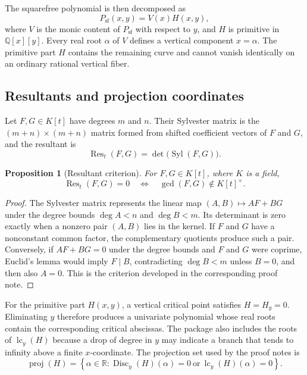 \documentclass[11pt,a4paper]{article}
\newtheorem{proposition}[definition]{Proposition}
\newcommand{\QQ}{\mathbb{Q}}
\newcommand{\RR}{\mathbb{R}}
\newcommand{\Res}{\operatorname{Res}}
\newcommand{\Disc}{\operatorname{Disc}}
\newcommand{\lc}{\operatorname{lc}}
\begin{document}
The squarefree polynomial is then decomposed as
\begin{equation}
  P_{\mathrm{sf}}(x,y)=V(x)H(x,y),
  \label{eq:vertical-decomposition}
\end{equation}
where $V$ is the monic content of $P_{\mathrm{sf}}$ with respect to $y$, and
$H$ is primitive in $\QQ[x][y]$. Every real root $\alpha$ of $V$ defines a
vertical component $x=\alpha$. The primitive part $H$ contains the remaining
curve and cannot vanish identically on an ordinary rational vertical fiber.

\subsection{Resultants and projection coordinates}

Let $F,G\in K[t]$ have degrees $m$ and $n$. Their Sylvester matrix is the
$(m+n)\times(m+n)$ matrix formed from shifted coefficient vectors of $F$ and
$G$, and the resultant is
\[
  \Res_t(F,G)=\det\bigl(\operatorname{Syl}(F,G)\bigr).
\]

\begin{proposition}[Resultant criterion]
For $F,G\in K[t]$, where $K$ is a field,
\[
  \Res_t(F,G)=0
  \quad\Longleftrightarrow\quad
  \gcd(F,G)\notin K[t]^{\times}.
\]
\end{proposition}

\begin{proof}
The Sylvester matrix represents the linear map
$(A,B)\mapsto AF+BG$ under the degree bounds
$\deg A<n$ and $\deg B<m$. Its determinant is zero exactly when a nonzero
pair $(A,B)$ lies in the kernel. If $F$ and $G$ have a nonconstant common
factor, the complementary quotients produce such a pair. Conversely, if
$AF+BG=0$ under the degree bounds and $F$ and $G$ were coprime, Euclid's lemma
would imply $F\mid B$, contradicting $\deg B<m$ unless $B=0$, and then also
$A=0$. This is the criterion developed in the corresponding proof note.
\end{proof}

For the primitive part $H(x,y)$, a vertical critical point satisfies
$H=H_y=0$. Eliminating $y$ therefore produces a univariate polynomial whose
real roots contain the corresponding critical abscissas. The package also
includes the roots of $\lc_y(H)$ because a drop of degree in $y$ may indicate
a branch that tends to infinity above a finite $x$-coordinate. The projection
set used by the proof notes is
\[
  \operatorname{proj}(H)=
  \left\{\alpha\in\RR:
    \Disc_y(H)(\alpha)=0
    \ \text{or}\ 
    \lc_y(H)(\alpha)=0
  \right\}.
\]
\end{document}
